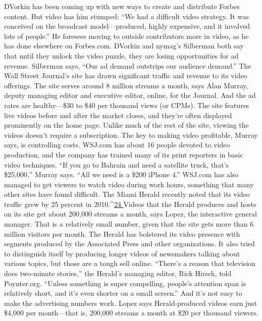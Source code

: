 DVorkin has been coming up with new ways to create and distribute Forbes
content. But video has him stumped: ``We had a difficult video strategy. It was
conceived on the broadcast model—produced, highly expensive, and it involved
lots of people.'' He foresees moving to outside contributors more in video, as he
has done elsewhere on Forbes.com. DVorkin and nymag’s Silberman both say
that until they unlock the video puzzle, they are losing opportunities for ad revenue.
Silberman says, ``Our ad demand outstrips our audience demand.''
The Wall Street Journal’s site has drawn significant traffic and revenue to its
video offerings. The site serves around 8 million streams a month, says Alan Murray,
deputy managing editor and executive editor, online, for the Journal. And the
ad rates are healthy—\$30 to \$40 per thousand views (or CPMs). The site features
live videos before and after the market closes, and they’re often displayed prominently
on the home page. Unlike much of the rest of the site, viewing the videos
doesn’t require a subscription.
The key to making video profitable, Murray says, is controlling costs. WSJ.com
has about 16 people devoted to video production, and the company has trained
many of its print reporters in basic video techniques. ``If you go to Bahrain and
need a satellite truck, that’s \$25,000,'' Murray says. ``All we need is a \$200 iPhone
4.'' WSJ.com has also managed to get viewers to watch video during work hours,
something that many other sites have found difficult.
The Miami Herald recently noted that its video traffic grew by 25 percent in
2010.^{\href{#endnotes-ch4}{24 }}Videos that the Herald produces and hosts on its site get about 200,000
streams a month, says Lopez, the interactive general manager. That is a relatively
small number, given that the site gets more than 6 million visitors per month.
The Herald has bolstered its video presence with segments produced by the
Associated Press and other organizations. It also tried to distinguish itself by producing
longer videos of newsmakers talking about various topics, but those are a
tough sell online. ``There’s a reason that television does two-minute stories,'' the
Herald’s managing editor, Rick Hirsch, told Poynter.org. ``Unless something is
super compelling, people’s attention span is relatively short, and it’s even shorter
on a small screen.'' And it’s not easy to make the advertising numbers work. Lopez
says Herald-produced videos earn just \$4,000 per month—that is, 200,000
streams a month at \$20 per thousand viewers.
